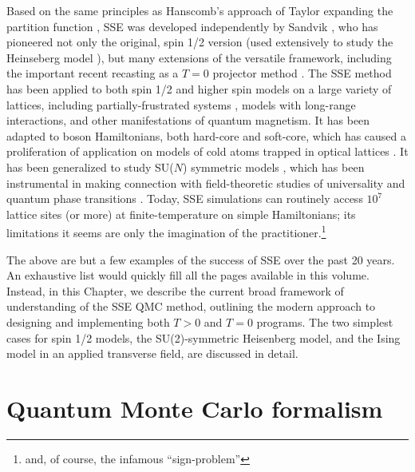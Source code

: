 \documentclass[vecphys]{svmult}
\begin{document}
Based on the same principles as Hanscomb's approach of Taylor expanding the partition function \cite{Melko:Handscomb62}, SSE was developed independently by Sandvik \cite{Melko:Sandvik91,Melko:Sandvik92}, who has pioneered not only the original, spin 1/2 version (used extensively to study the Heinseberg model \cite{Melko:SandvikHeis}), but many extensions of the versatile framework, including the important recent recasting as a $T=0$ projector method \cite{Melko:Sandvik05,Melko:Beach06}.  The SSE method has been applied to both spin 1/2 and higher spin models \cite{Melko:Kawashima94,Melko:HK} on a large variety of lattices, including partially-frustrated systems \cite{Melko:Melko07}, models with long-range interactions\cite{Melko:Sandvik03}, and other manifestations of quantum magnetism.  It has been adapted to boson Hamiltonians, both hard-core and soft-core, which has caused a proliferation of application on models of cold atoms trapped in optical lattices \cite{Melko:Wessel04}.  It has been generalized to study SU($N$) symmetric models \cite{Melko:harada2003:sun,Melko:Kawashima07}, which has been instrumental in making connection with field-theoretic studies of universality and quantum phase transitions \cite{Melko:kaul2011:j1j2,Melko:Designer}.  Today, SSE simulations can routinely access $10^7$ lattice sites (or more) at finite-temperature on simple Hamiltonians;  its limitations it seems are only the imagination of the practitioner.\footnote{and, of course, the infamous ``sign-problem''}

The above are but a few examples of the success of SSE over the past 20 years.  An exhaustive list would quickly fill all the pages available in this volume.  Instead, in this Chapter, we describe the current broad framework of understanding of the SSE QMC method, outlining the modern approach to designing and implementing both $T>0$ and $T=0$ programs.  The two simplest cases for spin 1/2 models, the SU(2)-symmetric Heisenberg model, and the Ising model in an applied transverse field, are discussed in detail.  

\section{Quantum Monte Carlo formalism}
\end{document}
